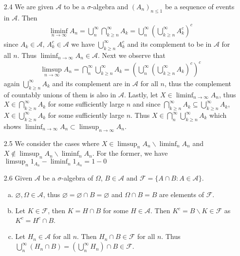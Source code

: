 \documentclass[a4paper,10pt]{article}
\theoremstyle{definition}
\begin{document}
\begin{enumerate}
\item[2.4] We are given $\mathcal{A}$ to be a $\sigma$-algebra and $(A_n)_{n \leq 1}$ be a sequence of events in $\mathcal{A}$. Then 
\begin{align*}
\liminf_{n \to \infty}A_n = \bigcup_n^{\infty} \bigcap_{k\geq n}^{\infty} A_k
= \bigcup_n^{\infty}\left(\bigcup_{k\geq n}^{\infty} A_k^c\right)^c
\end{align*}
since $A_k \in \mathcal{A}$, $A_k^c \in \mathcal{A}$ we have $\bigcup_{k\geq n}^{\infty} A_k^c$ and its complement to be in $\mathcal{A}$ for all $n$. Thus $\liminf_{n \to \infty} A_n \in \mathcal{A}$. Next we observe that 
\begin{align*}
\limsup_{n \to \infty}A_n = \bigcap_n^\infty \bigcup_{k \geq n}^\infty A_k = \left(\bigcup_n^\infty \left(\bigcup_{k \geq n}^\infty A_k\right)^c\right)^c
\end{align*}
again $\bigcup_{k \geq n}^\infty A_k$ and its complement are in $\mathcal{A}$ for all $n$, thus the complement of countably unions of them is also in $\mathcal{A}$. Lastly, let $X \in \liminf_{n \to \infty}A_n$, thus $X \in \bigcap_{k\geq n}^\infty A_k$ for some sufficiently large $n$ and since $\bigcap_{k\geq n}^\infty A_k \subseteq \bigcup_{k\geq n}^\infty A_k$, $X \in \bigcup_{k\geq n}^\infty A_k$ for some sufficiently large $n$. Thus $X \in \bigcap_n^\infty \bigcup_{k \geq n}^\infty A_k$ which shows $\liminf_{n \to \infty}A_n \subset \limsup_{n \to \infty}A_n$.

\item[2.5] We consider the cases where $X \in \limsup_{n} A_n\backslash \liminf_{n} A_n$ and $X \notin \limsup_{n} A_n\backslash \liminf_{n} A_n$. For the former, we have $\limsup_{n}1_{A_n}-\liminf_{n}1_{A_n} = 1-0$

\item[2.6] Given $\mathcal{A}$ be a $\sigma$-algebra of $\Omega$, $B \in \mathcal{A}$ and $\mathcal{F}=\{A \cap B: A \in \mathcal{A}\}$. 
\begin{enumerate}[(a)]
\item $\varnothing, \Omega \in \mathcal{A}$, thus $\varnothing = \varnothing \cap B = \varnothing$ and $\Omega \cap B = B$ are elements of $\mathcal{F}$.
\item Let $K \in \mathcal{F}$, then $K = H \cap B$ for some $H \in \mathcal{A}$. Then $K^c = B \backslash K \in \mathcal{F}$ as $K^c = H^c \cap B$.
\item Let $H_n \in \mathcal{A}$ for all $n$. Then $H_n \cap B \in \mathcal{F}$ for all $n$. Thus $\bigcup_{n}^\infty (H_n \cap B) = \left(\bigcup_{n}^\infty H_n\right) \cap B \in \mathcal{F}$.  
\end{enumerate}


\end{enumerate}
\end{document}
